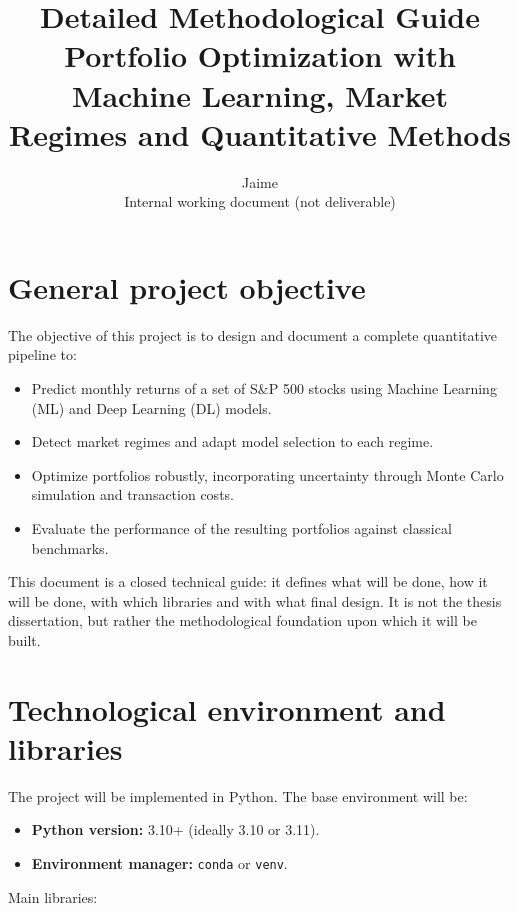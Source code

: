 \documentclass[12pt]{article}
\title{Detailed Methodological Guide\\
Portfolio Optimization with Machine Learning, Market Regimes and Quantitative Methods}
\author{Jaime\\\small Internal working document (not deliverable)}
\date{}
\begin{document}
\maketitle

\tableofcontents
\newpage

\section{General project objective}

The objective of this project is to design and document a complete quantitative pipeline to:

\begin{itemize}
    \item Predict monthly returns of a set of S\&P 500 stocks using Machine Learning (ML) and Deep Learning (DL) models.
    \item Detect market regimes and adapt model selection to each regime.
    \item Optimize portfolios robustly, incorporating uncertainty through Monte Carlo simulation and transaction costs.
    \item Evaluate the performance of the resulting portfolios against classical benchmarks.
\end{itemize}

This document is a closed technical guide: it defines what will be done, how it will be done, with which libraries and with what final design. It is not the thesis dissertation, but rather the methodological foundation upon which it will be built.

\section{Technological environment and libraries}

The project will be implemented in Python. The base environment will be:

\begin{itemize}
    \item \textbf{Python version:} 3.10+ (ideally 3.10 or 3.11).
    \item \textbf{Environment manager:} \texttt{conda} or \texttt{venv}.
\end{itemize}

Main libraries:
\end{document}
